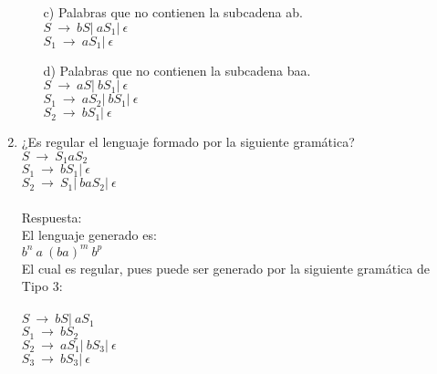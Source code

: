 \documentclass{article}
\begin{document}
\begin{enumerate}
\begin{itemize}
    \item[c)] Palabras que no contienen la subcadena ab.\\
    $ S\ \rightarrow\ bS |\ aS_{1} |\ \epsilon $\\
    $ S_{1}\ \rightarrow\ aS_{1} |\ \epsilon $

    \item[d)] Palabras que no contienen la subcadena baa.\\
    $S\ \rightarrow\ aS |\ bS_{1} |\ \epsilon $\\
    $S_{1}\ \rightarrow\ aS_{2} |\ bS_{1} |\ \epsilon $\\
    $S_{2}\ \rightarrow\ bS_{1} |\ \epsilon $
  \end{itemize}
  \item{}         %
  ¿Es regular el lenguaje formado por la siguiente gramática?\\
  $S\ \rightarrow\ S_{1}aS_{2} $\\
  $S_{1}\ \rightarrow\ bS_{1} |\ \epsilon $\\
  $S_{2}\ \rightarrow\ S_{1} |\ baS_{2} |\ \epsilon $\\
  \\
  Respuesta:\\
  El lenguaje generado es:\\
  $b^{n}\ a\ (ba)^{m}\ b^{p}$\\
  El cual es regular, pues puede ser generado por la siguiente gramática de Tipo 3:\\
  \\
  $S\ \rightarrow\ bS |\ aS_{1} $\\
  $S_{1}\ \rightarrow\ bS_{2} $\\
  $S_{2}\ \rightarrow\ aS_{1} |\ bS_{3} |\ \epsilon $\\
  $S_{3}\ \rightarrow\ bS_{3} |\ \epsilon $\\
\end{enumerate}
\end{document}

